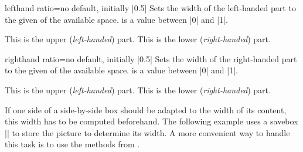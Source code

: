 \clearpage
\begin{docTcbKey}{lefthand ratio}{=}{no default, initially |0.5|}
Sets the width of the left-handed part to the given  of
the available space.  is a value between |0| and |1|.
\begin{dispExample}

\begin{tcolorbox}[title=My title,sidebyside,lefthand ratio=0.25]
This is the upper (\textit{left-handed}) part.
\tcblower
This is the lower (\textit{right-handed}) part.
\end{tcolorbox}
\end{dispExample}
\end{docTcbKey}


\begin{docTcbKey}{righthand ratio}{=}{no default, initially |0.5|}
Sets the width of the right-handed part to the given  of
the available space.  is a value between |0| and |1|.
\begin{dispExample}

\begin{tcolorbox}[title=My title,sidebyside,righthand ratio=0.25]
This is the upper (\textit{left-handed}) part.
\tcblower
This is the lower (\textit{right-handed}) part.
\end{tcolorbox}
\end{dispExample}
\end{docTcbKey}


\clearpage
If one side of a side-by-side box should be adapted to the width of
its content, this width has to be computed beforehand.
The following example uses a savebox |\mysavebox| to store the picture to determine
its width. A more convenient way to handle this task is to use the
methods from .



